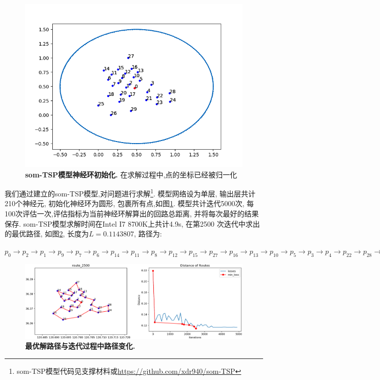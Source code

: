 \begin{figure}[h]
    \begin{center}
        \includegraphics[width=0.55\linewidth]{fig/init}
    \end{center}
    \caption{\textbf{som-TSP模型神经环初始化.} 在求解过程中,点的坐标已经被归一化 }
        \label{fig:init}
  \end{figure}
  我们通过建立的som-TSP模型,对问题进行求解\footnote{som-TSP模型代码见支撑材料或\url{https://github.com/xdr940/som-TSP}}. 模型网络设为单层, 输出层共计210个神经元, 初始化神经环为圆形, 包裹所有点,如图\ref{fig:init}. 
模型共计迭代5000次, 每100次评估一次,评估指标为当前神经环解算出的回路总距离, 并将每次最好的结果保存. som-TSP模型求解时间在Intel I7 8700K上共计4.9s, 在第2500 次迭代中求出的最优路径, 如图\ref{fig:solution}, 长度为$L=0.1143807$, 路径为:

$p_{0}\rightarrow p_2\rightarrow p_1\rightarrow p_9\rightarrow p_7\rightarrow p_6\rightarrow p_{14}\rightarrow p_{11}\rightarrow p_{8}\rightarrow  p_{12}\rightarrow  p_{15}\rightarrow  p_{27}\rightarrow  p_{16}\rightarrow  p_{13}\rightarrow  p_{10}\rightarrow p_{5}\rightarrow p_{3}\rightarrow p_{4}\rightarrow p_{22}\rightarrow  p_{28}\rightarrow p_{24}\rightarrow p_{23}\rightarrow p_{21}\rightarrow p_{29}\rightarrow p_{26}\rightarrow p_{25}\rightarrow p_{18}\rightarrow p_{19}\rightarrow p_{20}\rightarrow p_{17}$


\begin{figure}[h]
    \begin{center}
        \includegraphics[width=1.0\linewidth]{fig/solution}
    \end{center}
    \caption{\textbf{最优解路径与迭代过程中路径变化.} }
        \label{fig:solution}
  \end{figure}






